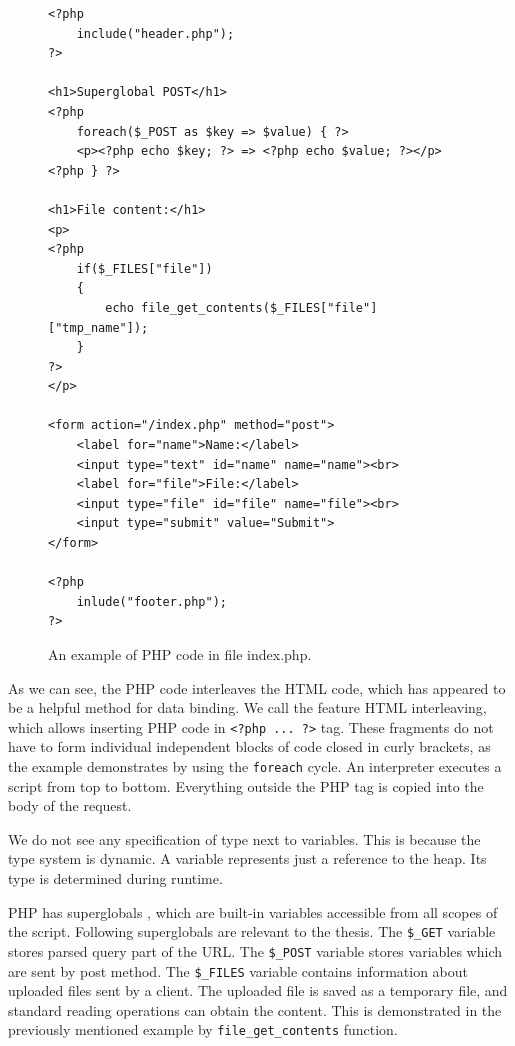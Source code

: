 \begin{figure}
\begin{lstlisting}
<?php
    include("header.php");
?>

<h1>Superglobal POST</h1>
<?php
    foreach($_POST as $key => $value) { ?>
    <p><?php echo $key; ?> => <?php echo $value; ?></p>
<?php } ?>

<h1>File content:</h1>
<p>
<?php 
    if($_FILES["file"])
    {
        echo file_get_contents($_FILES["file"]["tmp_name"]);
    }	
?>
</p>

<form action="/index.php" method="post">
    <label for="name">Name:</label>
    <input type="text" id="name" name="name"><br>
    <label for="file">File:</label>
    <input type="file" id="file" name="file"><br>
    <input type="submit" value="Submit">
</form>

<?php
    inlude("footer.php");
?>
\end{lstlisting}
\caption{An example of PHP code in file index.php.}
\label{img01:php}
\end{figure}
\par
As we can see, the PHP code interleaves the HTML code, which has appeared to be a helpful method for data binding.
We call the feature HTML interleaving, which allows inserting PHP code in \texttt{<?php ... ?>} tag.
These fragments do not have to form individual independent blocks of code closed in curly brackets, as the example demonstrates by using the \texttt{foreach} cycle.
An interpreter executes a script from top to bottom. Everything outside the PHP tag is copied into the body of the request.
\par
We do not see any specification of type next to variables.
This is because the type system is dynamic.
A variable represents just a reference to the heap.
Its type is determined during runtime. 
\par
PHP has superglobals , which are built-in variables accessible from all scopes of the script.
Following superglobals are relevant to the thesis.
The \texttt{\$\_GET} variable stores parsed query part of the URL.
The \texttt{\$\_POST} variable stores variables which are sent by post method.
The \texttt{\$\_FILES} variable contains information about uploaded files sent by a client.
The uploaded file is saved as a temporary file, and standard reading operations can obtain the content.
This is demonstrated in the previously mentioned example by \texttt{file\_get\_contents} function.
\par
{}
